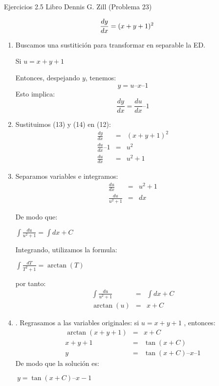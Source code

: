 \documentclass[l etterpaper,11pt]{article}
\begin{document}
Ejercicios 2.5 Libro Dennis G. Zill (Problema 23)

\begin{equation}
\frac{d y}{d x} = (x + y + 1)^2\\	
\end{equation}
\begin{enumerate}

\item Buscamos una sustitición para transformar en separable la ED.


\begin{center}
Si  $u = x + y + 1$\\
\end{center}
Entonces, despejando $y$, tenemos:
\begin{equation}
y = u – x – 1
\end{equation}
Esto implica:
\begin{equation}
\frac{d y}{d x} = \frac{d u}{d x} – 1
\end{equation}

\item  Sustituimos (13) y (14) en (12):
\begin{eqnarray*}
\frac{d y}{d x} & = & (x + y + 1)^2\\
\frac{d u}{d x} – 1 & = & u^2\\
\frac{d u}{d x} & = & u^2 + 1
\end{eqnarray*}

\item Separamos variables e integramos:
\begin{eqnarray*}
\frac{d u}{d x} & = & u^2 + 1\\
\frac{d u}{u^2 + 1} & = & d x
\end{eqnarray*}

De modo que:

\begin{center}
$\int \frac{d u}{u^2 + 1} = \int d x + C$\\
\end{center}

Integrando, utilizamos la formula:
\begin{center}
$\int \frac{d T}{T^2 + 1} = \arctan (T)$\\
\end{center}

por tanto:
\begin{eqnarray*}
\int \frac{d u}{u^2 + 1} & = & \int d x + C\\
\arctan (u) & = & x + C
\end{eqnarray*}

\item. Regrasamos a las variables originales:
si $u=x+y+1$ , entonces:
\begin{eqnarray*}
\arctan (x + y + 1) & = & x + C\\
x + y + 1 & = & \tan (x + C)\\
y & = & \tan (x + C) – x – 1
\end{eqnarray*}
De modo que la solución es:
\begin{center}
$\ y = \tan{(x + C)} – x -1$\\
\end{center}

\end{enumerate}
\end{document}

